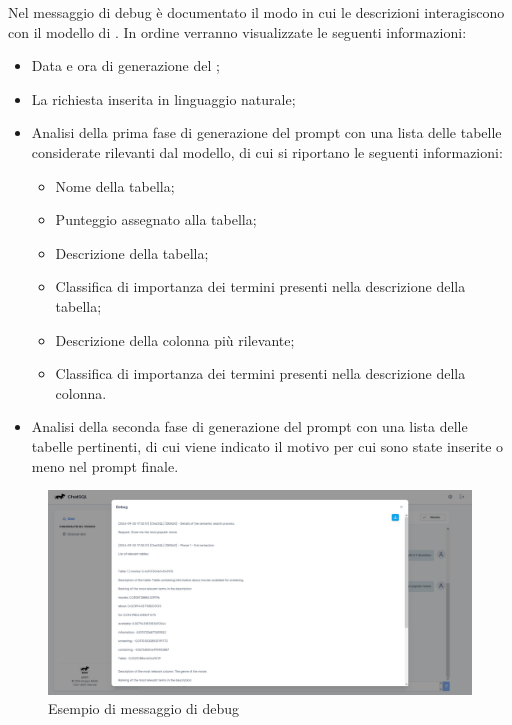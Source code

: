 \par Nel messaggio di debug è documentato il modo in cui le descrizioni interagiscono con il modello di . In ordine verranno visualizzate le seguenti informazioni: 
\begin{itemize}
  \item Data e ora di generazione del ; 
  \item La richiesta inserita in linguaggio naturale;
  \item Analisi della prima fase di generazione del prompt con una lista delle tabelle considerate rilevanti dal modello, di cui si riportano le seguenti informazioni:
  \begin{itemize}
    \item Nome della tabella;
    \item Punteggio assegnato alla tabella;
    \item Descrizione della tabella;
    \item Classifica di importanza dei termini presenti nella descrizione della tabella;
    \item Descrizione della colonna più rilevante;
    \item Classifica di importanza dei termini presenti nella descrizione della colonna.
  \end{itemize}
  \item Analisi della seconda fase di generazione del prompt con una lista delle tabelle pertinenti, di cui viene indicato il motivo per cui sono state inserite o meno nel prompt finale.
\end{itemize}
\begin{figure}[H]
  \centering
  \includegraphics[width=\textwidth]{assets/analisi_debug.png}
  \caption{Esempio di messaggio di debug}
\end{figure}

